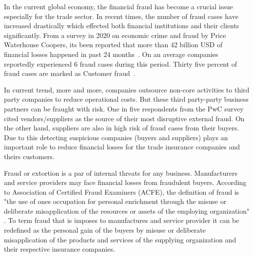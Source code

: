 
In the current global economy, the financial fraud has become a crucial issue especially for the trade sector. In recent times, the number of fraud cases have increased drastically which effected both financial institutions and their clients significantly. From a survey in 2020 on economic crime and fraud by Price Waterhouse Coopers, its been reported that more than 42 billion USD of financial losses happened in past 24 months~\cite{PwC.Crime.Survey}. On an average companies reportedly experienced 6 fraud cases during this period. Thirty five percent of fraud cases are marked as Customer fraud~\cite{PwC.Crime.Survey}.   

In current trend, more and more, companies outsource non-core activities to third party companies to reduce operational costs. But these third party-party business partners can be fraught with risk. One in five respondents from the PwC survey~\cite{PwC.Crime.Survey} cited vendors/suppliers as the source of their most disruptive external fraud. On the other hand, suppliers are also in high risk of fraud cases from their buyers. Due to this detecting suspicious companies (buyers and suppliers) plays an important role to reduce financial losses for the trade insurance companies and theirs customers.


Fraud or extortion is a par of internal threats for any business. Manufacturers and service providers may face financial losses from fraudulent buyers. According to Association of Certified Fraud Examiners (ACFE), the definition of fraud is "the use of one\’s occupation for personal enrichment through the misuse or deliberate
misapplication of the resources or assets of the employing organization" \cite{kassem_2014}. To term fraud that is imposes to manufactures and service provider it can be redefined as the personal gain of the buyers by misuse or deliberate misapplication of the products and services of the supplying organization and their respective insurance companies.




